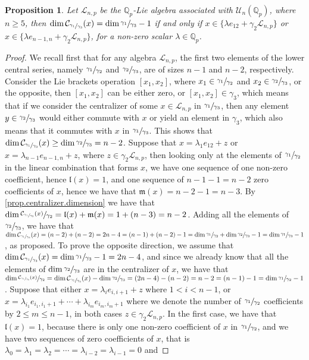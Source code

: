 \documentclass[12pt,fleqn]{article}
\newtheorem{proposition}[theorem]{Proposition}
\begin{document}
\begin{proposition}
\label{prop.n.geq.5.centralizer.codimension}
Let $\mathcal{L}_{n,p}$ be the $\mathbb{Q}_p$-Lie algebra associated with $\mathcal{U}_n(\mathbb{Q}_p)$, where $n\geq 5$, then $\dim\mathcal{C}_{\sfrac{\gamma_1}{\gamma_3}}(x)=\dim\sfrac{\gamma_1}{\gamma_3}-1$ if and only if $x\in\{\lambda e_{12}+\gamma_2\mathcal{L}_{n,p}\}$ or $x\in\{\lambda e_{n-1,n}+\gamma_2\mathcal{L}_{n,p}\}$, for a non-zero scalar $\lambda\in\mathbb{Q}_p$.
\end{proposition}
\begin{proof}
We recall first that for any algebra $\mathcal{L}_{n,p}$, the first two elements of the lower central series, namely $\sfrac{\gamma_1}{\gamma_2}$ and $\sfrac{\gamma_2}{\gamma_3}$, are of sizes $n-1$ and $n-2$, respectively. Consider the Lie brackets operation $[x_1,x_2]$, where $x_1\in\sfrac{\gamma_1}{\gamma_2}$ and $x_2\in\sfrac{\gamma_2}{\gamma_3}$, or the opposite, then $[x_1,x_2]$ can be either zero, or $[x_1,x_2]\in\gamma_3$, which means that if we consider the centralizer of some $x\in\mathcal{L}_{n,p}$ in $\sfrac{\gamma_1}{\gamma_3}$, then any element $y\in\sfrac{\gamma_2}{\gamma_3}$ would either commute with $x$ or yield an element in $\gamma_3$, which also means that it commutes with $x$ in $\sfrac{\gamma_1}{\gamma_3}$. This shows that $\dim\mathcal{C}_{\sfrac{\gamma_1}{\gamma_3}}(x)\geq\dim\sfrac{\gamma_2}{\gamma_3}=n-2$. Suppose that $x=\lambda_1 e_{12}+z$ or $x=\lambda_{n-1}e_{n-1,n}+z$, where $z\in\gamma_2\mathcal{L}_{n,p}$, then looking only at the elements of $\sfrac{\gamma_1}{\gamma_2}$ in the linear combination that forms $x$, we have one sequence of one non-zero coefficient, hence $\mathfrak{l}(x)=1$, and one sequence of $n-1-1=n-2$ zero coefficients of $x$, hence we have that $\mathfrak{m}(x)=n-2-1=n-3$. By \ref{prop.centralizer.dimension} we have that $\dim\sfrac{\mathcal{C}_{\sfrac{\gamma_1}{\gamma_3}}(x)}{\gamma_2}=\mathfrak{l}(x)+\mathfrak{m}(x)=1+(n-3)=n-2$. Adding all the elements of $\sfrac{\gamma_2}{\gamma_3}$, we have that $\dim\mathcal{C}_{\sfrac{\gamma_1}{\gamma_3}}(x)=(n-2)+(n-2)=2n-4=(n-1)+(n-2)-1=\dim\sfrac{\gamma_1}{\gamma_2}+\dim\sfrac{\gamma_2}{\gamma_3}-1=\dim\sfrac{\gamma_1}{\gamma_3}-1$, as proposed. To prove the opposite direction, we assume that $\dim\mathcal{C}_{\sfrac{\gamma_1}{\gamma_3}}(x)=\dim\sfrac{\gamma_1}{\gamma_3}-1=2n-4$, and since we already know that all the elements of $\dim\sfrac{\gamma_2}{\gamma_3}$ are in the centralizer of $x$, we have that $\dim\sfrac{\mathcal{C}_{\sfrac{\gamma_1}{\gamma_3}}(x)}{\gamma_2}=\dim\mathcal{C}_{\sfrac{\gamma_1}{\gamma_3}}(x)-\dim\sfrac{\gamma_2}{\gamma_3}=(2n-4)-(n-2)=n-2=(n-1)-1=\dim\sfrac{\gamma_1}{\gamma_2}-1$. Suppose that either $x=\lambda_i e_{i,i+1}+z$ where $1<i<n-1$, or $x=\lambda_{i_1}e_{i_1,i_1+1}+\cdots+\lambda_{i_m}e_{i_m,i_m+1}$ where we denote the number of $\sfrac{\gamma_1}{\gamma_2}$ coefficients by $2\leq m\leq n-1$, in both cases $z\in\gamma_2\mathcal{L}_{n,p}$. In the first case, we have that $\mathfrak{l}(x)=1$, because there is only one non-zero coefficient of $x$ in $\sfrac{\gamma_1}{\gamma_2}$, and we have two sequences of zero coefficients of $x$, that is $\lambda_0=\lambda_1=\lambda_2=\cdots=\lambda_{i-2}=\lambda_{i-1}=0$ and 
\end{proof}
\end{document}

